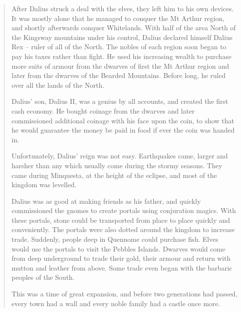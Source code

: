 \begin{quotation}
After Dalius struck a deal with the elves, they left him to his own devices.  It was mostly alone that he managed to conquer the Mt Arthur region, and shortly afterwards conquer Whitelands.  With half of the area North of the Kingsway mountains under his control, Dalius declared himself Dalius Rex -- ruler of all of the North.  The nobles of each region soon began to pay his taxes rather than fight.  He used his increasing wealth to purchase more suits of armour from the dwarves of first the Mt Arthur region and later from the dwarves of the Bearded Mountains.  Before long, he ruled over all the lands of the North.

	Dalius' son, Dalius II, was a genius by all accounts, and created the first cash economy.  He bought coinage from the dwarves and later commissioned additional coinage with his face upon the coin, to show that he would guarantee the money be paid in food if ever the coin was handed in.

	Unfortunately, Dalius' reign was not easy.  Earthquakes came, larger and harsher than any which usually come during the stormy seasons.  They came during Minquesta, at the height of the eclipse, and most of the kingdom was levelled.

	Dalius was as good at making friends as his father, and quickly commissioned the gnomes to create portals using conjuration magics.  With these portals, stone could be transported from place to place quickly and conveniently.  The portals were also dotted around the kingdom to increase trade.  Suddenly, people deep in Quennome could purchase fish.  Elves would use the portals to visit the Pebbles Islands.  Dwarves would come from deep underground to trade their gold, their armour and return with mutton and leather from above.  Some trade even began with the barbaric peoples of the South.

	This was a time of great expansion, and before two generations had passed, every town had a wall and every noble family had a castle once more.
\end{quotation}

